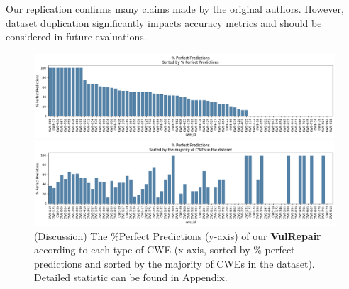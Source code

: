 Our replication confirms many claims made by the original authors. However, dataset duplication significantly impacts accuracy metrics and should be considered in future evaluations.



\begin{figure}[H]
    \begin{center}
    \includegraphics[width=1\linewidth]{figures/cve.png}
    \end{center}
    \begin{center}
        \includegraphics[width=1\linewidth]{figures/cwe.png}
    \end{center}
    \caption{(Discussion) The \%Perfect Predictions (y-axis) of our \textbf{VulRepair} according to each type of CWE (x-axis, sorted by \% perfect predictions and sorted by the majority of CWEs in the dataset). Detailed statistic can be found in Appendix.}
    \label{fig:cve}
\end{figure}


